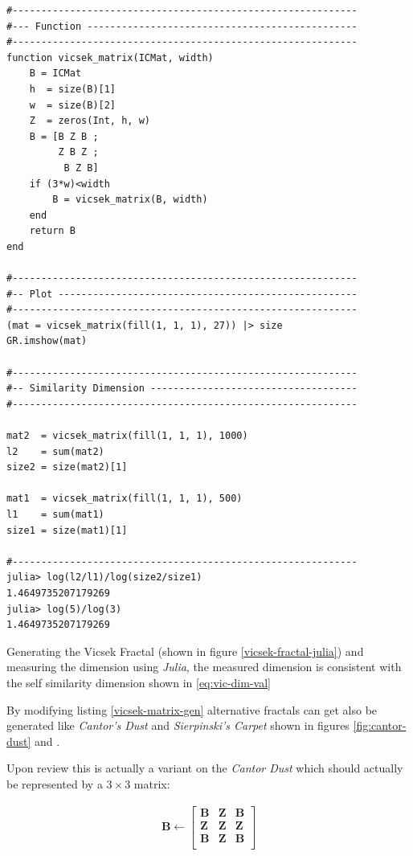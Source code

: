 \documentclass[a4paper,11pt,twoside]{article}
\begin{document}
\begin{listing}[htbp]
\begin{verbatim}
#------------------------------------------------------------
#--- Function -----------------------------------------------
#------------------------------------------------------------
function vicsek_matrix(ICMat, width)
    B = ICMat
    h  = size(B)[1]
    w  = size(B)[2]
    Z  = zeros(Int, h, w)
    B = [B Z B ;
         Z B Z ;
          B Z B]
    if (3*w)<width
        B = vicsek_matrix(B, width)
    end
    return B
end

#------------------------------------------------------------
#-- Plot ----------------------------------------------------
#------------------------------------------------------------
(mat = vicsek_matrix(fill(1, 1, 1), 27)) |> size
GR.imshow(mat)

#------------------------------------------------------------
#-- Similarity Dimension ------------------------------------
#------------------------------------------------------------

mat2  = vicsek_matrix(fill(1, 1, 1), 1000)
l2    = sum(mat2)
size2 = size(mat2)[1]

mat1  = vicsek_matrix(fill(1, 1, 1), 500)
l1    = sum(mat1)
size1 = size(mat1)[1]

#------------------------------------------------------------
julia> log(l2/l1)/log(size2/size1)
1.4649735207179269
julia> log(5)/log(3)
1.4649735207179269
\end{verbatim}
\caption{\label{vicsek-matrix-gen}Generating the Vicsek Fractal (shown in figure \ref{vicsek-fractal-julia}) and measuring the dimension using \emph{Julia}, the measured dimension is consistent with the self similarity dimension shown in \eqref{eq:vic-dim-val}}
\end{listing}

By modifying listing \ref{vicsek-matrix-gen} alternative fractals can get also be generated like \emph{Cantor's Dust} and \emph{Sierpinski's Carpet} shown in figures \ref{fig:cantor-dust} and .

Upon review this is actually a variant on the \emph{Cantor Dust} which should
actually be represented by a \(3 \times 3\) matrix:

\begin{align}
 \mathbf{B} \leftarrow
 \begin{bmatrix}
    \mathbf{B} & \mathbf{Z} & \mathbf{B} \\
    \mathbf{Z} & \mathbf{Z} & \mathbf{Z} \\
    \mathbf{B} & \mathbf{Z} & \mathbf{B} \\
\end{bmatrix}
\end{align}
\end{document}
